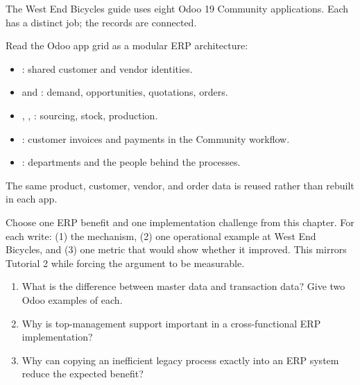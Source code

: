 The West End Bicycles guide uses eight Odoo 19 Community applications. Each has
a distinct job; the records are connected.

\begin{applicationbox}
Read the Odoo app grid as a modular ERP architecture:
\begin{itemize}
  \item {}: shared customer and vendor identities.
  \item {} and : demand, opportunities, quotations, orders.
  \item {}, , : sourcing, stock, production.
  \item {}: customer invoices and payments in the Community workflow.
  \item {}: departments and the people behind the processes.
\end{itemize}
The same product, customer, vendor, and order data is reused rather than rebuilt
in each app.
\end{applicationbox}

\begin{tryit}
Choose one ERP benefit and one implementation challenge from this chapter. For
each write: (1) the mechanism, (2) one operational example at West End Bicycles,
and (3) one metric that would show whether it improved. This mirrors Tutorial 2
while forcing the argument to be measurable.
\end{tryit}

\begin{quickcheck}
\begin{enumerate}
  \item What is the difference between master data and transaction data? Give two Odoo examples of each.
  \item Why is top-management support important in a cross-functional ERP implementation?
  \item Why can copying an inefficient legacy process exactly into an ERP system reduce the expected benefit?
\end{enumerate}
\end{quickcheck}
